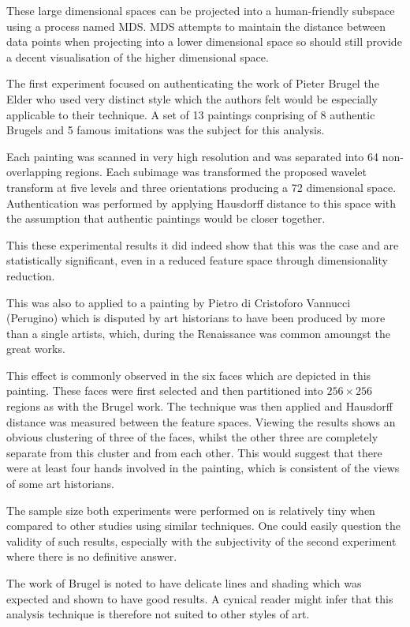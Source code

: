 \documentclass[conference]{IEEEtran}
\begin{document}
These large dimensional spaces can be projected into a human-friendly subspace
using a process named \gls{MDS}. \Gls{MDS} attempts to maintain the distance
between data points when projecting into a lower dimensional space so should
still provide a decent visualisation of the higher dimensional space.

The first experiment focused on authenticating the work of Pieter Brugel the
Elder who used very distinct style which the authors felt would be especially
applicable to their technique. A set of 13 paintings conprising of 8 authentic
Brugels and 5 famous imitations was the subject for this analysis.

Each painting was scanned in very high resolution and was separated into 64
non-overlapping regions. Each subimage was transformed the proposed wavelet
transform at five levels and three orientations producing a 72 dimensional
space. Authentication was performed by applying Hausdorff distance to this
space with the assumption that authentic paintings would be closer together.

This these experimental results it did indeed show that this was the case and
are statistically significant, even in a reduced feature space through
dimensionality reduction.

This was also to applied to a painting by Pietro di Cristoforo Vannucci
(Perugino) which is disputed by art historians to have been produced by more
than a single artists, which, during the Renaissance was common amoungst the
great works.

This effect is commonly observed in the six faces which are depicted in this
painting. These faces were first selected and then partitioned into $256 \times
256$ regions as with the Brugel work. The technique was then applied and
Hausdorff distance was measured between the feature spaces. Viewing the results
shows an obvious clustering of three of the faces, whilst the other three are
completely separate from this cluster and from each other. This would suggest
that there were at least four hands involved in the painting, which is
consistent of the views of some art historians.

The sample size both experiments were performed on is relatively tiny when
compared to other studies using similar techniques. One could easily question
the validity of such results, especially with the subjectivity of the second
experiment where there is no definitive answer.

The work of Brugel is noted to have delicate lines and shading which was
expected and shown to have good results. A cynical reader might infer that this
analysis technique is therefore not suited to other styles of art.
\end{document}
